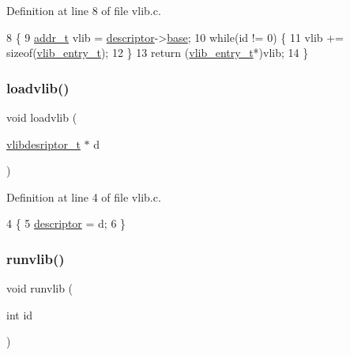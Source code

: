 Definition at line 8 of file vlib.\+c.


\begin{DoxyCode}
8                                    \{
9     \hyperlink{a00116_a295f71165288684c38c6bb836fbb3c59_a295f71165288684c38c6bb836fbb3c59}{addr\_t} vlib = \hyperlink{a00158_abe9fbaaf473cf2fa8d2a0ef1786fabd2_abe9fbaaf473cf2fa8d2a0ef1786fabd2}{descriptor}->\hyperlink{a00254_a0a6151ac18d60c648baec065efc9af1a_a0a6151ac18d60c648baec065efc9af1a}{base};
10     \textcolor{keywordflow}{while}(\textcolor{keywordtype}{id} != 0) \{
11         vlib += \textcolor{keyword}{sizeof}(\hyperlink{a00158_a97c1a7136f2ab06368e93c2d7533d619_a97c1a7136f2ab06368e93c2d7533d619}{vlib\_entry\_t});
12     \}
13     \textcolor{keywordflow}{return} (\hyperlink{a00250}{vlib\_entry\_t}*)vlib;
14 \}
\end{DoxyCode}
\mbox{\label{a00155_aee69008de31826f28854c29a54cb315e_aee69008de31826f28854c29a54cb315e}} 
\subsubsection{\texorpdfstring{loadvlib()}{loadvlib()}}
{\footnotesize\ttfamily void loadvlib (\begin{DoxyParamCaption}\item[{\hyperlink{a00158_a2d9000b4fbb25c5ed2950a2d8f4921d5_a2d9000b4fbb25c5ed2950a2d8f4921d5}{vlibdesriptor\+\_\+t} $\ast$}]{d }\end{DoxyParamCaption})}



Definition at line 4 of file vlib.\+c.


\begin{DoxyCode}
4                                   \{
5     \hyperlink{a00158_abe9fbaaf473cf2fa8d2a0ef1786fabd2_abe9fbaaf473cf2fa8d2a0ef1786fabd2}{descriptor} = d;
6 \}
\end{DoxyCode}
\mbox{\label{a00155_a6889af26c1cca94090023d5975955cbf_a6889af26c1cca94090023d5975955cbf}} 
\subsubsection{\texorpdfstring{runvlib()}{runvlib()}}
{\footnotesize\ttfamily void runvlib (\begin{DoxyParamCaption}\item[{int}]{id }\end{DoxyParamCaption})}




